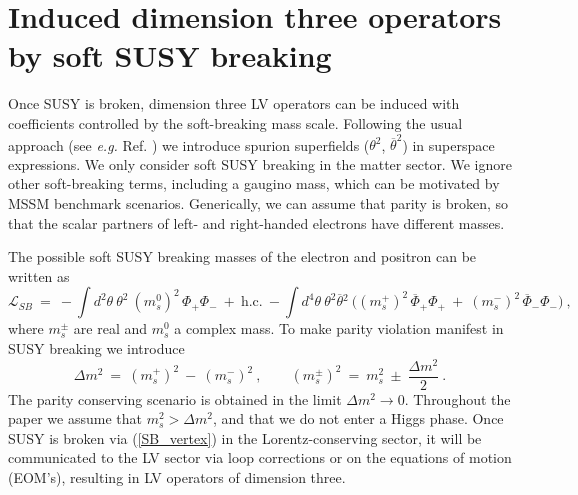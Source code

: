 \documentclass[12pt]{revtex4}
\begin{document}
\section{Induced dimension three operators by soft SUSY breaking}
\label{InducedDim3}


Once SUSY is broken, dimension three LV operators can be induced 
with coefficients controlled by the soft-breaking mass scale. 
Following the usual approach (see {\em e.g.} Ref. \cite{Wess:1992cp})
we introduce spurion superfields ($\theta^2$, $\overline\theta^2$) in
superspace expressions. We only consider soft SUSY breaking in the
matter sector. We ignore other soft-breaking terms, including a
gaugino mass, which can be motivated by MSSM benchmark scenarios.
Generically, we can assume that parity is broken, so that
the scalar partners of left- and right-handed electrons have different masses.


The possible soft SUSY breaking masses of the electron and positron
can be written as 
\begin{equation}
\label{SB_vertex}
  \mathcal{L}_{SB} ~=~  
- \int d^2\theta ~ \theta^2~ 
(m_{s}^0)^2 \, \Phi_+ \Phi_-
~+~ \text{h.c.} 
~- \int d^4\theta ~
\theta^2\overline{\theta}{}^2~ 
\Big( 
(m_s^+)^2\, \overline{\Phi}_+ \Phi_+ 
~+~
(m_s^-)^2\, \overline{\Phi}_- \Phi_-
\Big)  
~, 
\end{equation}
%
where $m_s^\pm$ are real and $m_s^{0}$ a complex mass. 
To make parity violation manifest in SUSY breaking we introduce 
\begin{equation}
\Delta m^2 ~=~ (m_{s}^+)^2 ~ - ~ (m_{s}^-)^2~, 
\qquad
(m_{s}^\pm)^2 ~=~ m_s^2 ~\pm~ \frac{\Delta m^2}2~.
\label{deltam}
\end{equation}
%
The parity conserving scenario is obtained in the limit 
$ \Delta m^2 \to 0 $. Throughout the paper we assume that 
$m_s^2>\Delta m^2$, and that we do not enter a Higgs phase. Once SUSY
is broken via (\ref{SB_vertex}) in the Lorentz-conserving sector, it
will be communicated to the LV sector via loop corrections or on the
equations of motion (EOM's), resulting in LV operators of dimension three.  
\end{document}
